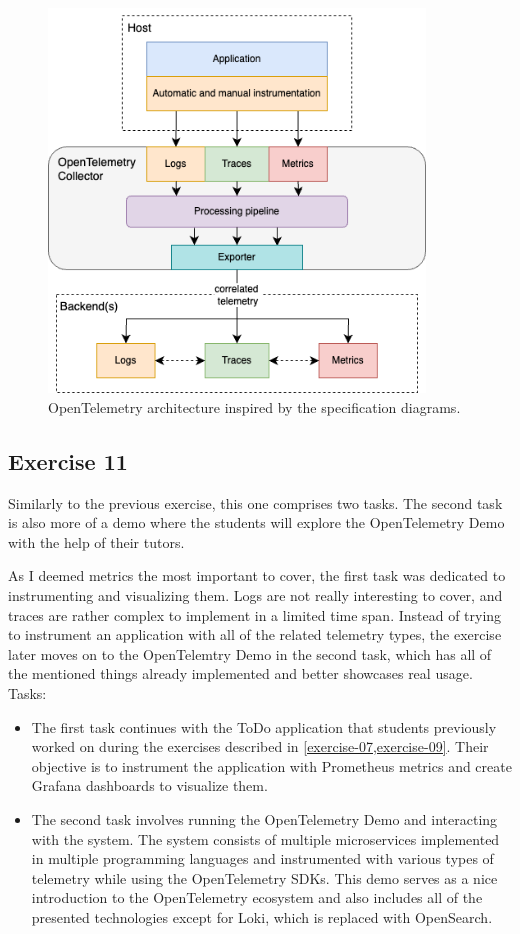 \documentclass[
  digital,
  color,
  oneside,
  nosansbold,
  nocolorbold,
  nolof,
  nolot,
]{fithesis4}
\begin{document}
\begin{figure}[H]
    \centering
    \includegraphics[width=10cm]{figures/opentelemetry-architecture.png}
    \caption{OpenTelemetry architecture inspired by the specification diagrams\cite{open-telemetry-spec}.}
    \label{fig:otel}
\end{figure}

\subsection{Exercise 11}\label{exercise-11}

Similarly to the previous exercise, this one comprises two tasks. The second task is also more of a demo where the students will explore the OpenTelemetry Demo\cite{open-telemetry-demo} with the help of their tutors.

As I deemed metrics the most important to cover, the first task was dedicated to instrumenting and visualizing them. Logs are not really interesting to cover, and traces are rather complex to implement in a limited time span. Instead of trying to instrument an application with all of the related telemetry types, the exercise later moves on to the OpenTelemtry Demo in the second task, which has all of the mentioned things already implemented and better showcases real usage. \\

\noindent
Tasks:
\begin{itemize}
    \item The first task continues with the ToDo application that students previously worked on during the exercises described in \cref{exercise-07,exercise-09}. Their objective is to instrument the application with Prometheus metrics and create Grafana dashboards to visualize them.
    \item The second task involves running the OpenTelemetry Demo and interacting with the system. The system consists of multiple microservices implemented in multiple programming languages and instrumented with various types of telemetry while using the OpenTelemetry SDKs. This demo serves as a nice introduction to the OpenTelemetry ecosystem and also includes all of the presented technologies except for Loki, which is replaced with OpenSearch\cite{opensearch}.
\end{itemize}
\end{document}

